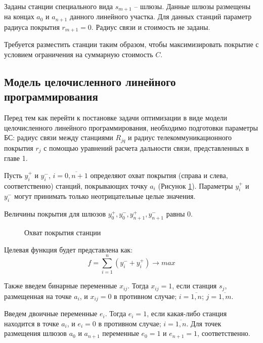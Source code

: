 Заданы станции специального вида $s_{m+1}$ -- шлюзы. Данные шлюзы размещены на концах $a_0$ и $a_{n+1}$ данного линейного участка. Для данных станций параметр радиуса покрытия $r_{m+1}=0$. Радиус связи и стоимость не заданы.

Требуется разместить станции таким образом, чтобы максимизировать покрытие с условием ограничения на суммарную стоимость $C$.


\subsection{Модель целочисленного линейного программирования}

Перед тем как перейти к постановке задачи оптимизации в виде модели целочисленного линейного программирования, необходимо подготовки параметры БС: радиус связи между станциями $R_{jq}$ и радиус телекоммуникационного покрытия $r_j$ с помощью уравнений расчета дальности связи, представленных в главе 1.



Пусть $y_i^+$ и $y_i^-$, $i= \overline{0,n+1}$ определяют охват покрытия (справа и слева, соответственно) станций, покрывающих точку $a_i$ (Рисунок \cref{fig:part3_station_coverage}). Параметры $y_i^+$ и $y_i^-$ могут принимать только неотрицательные целые значения.

Величины  покрытия для шлюзов $y_0^+, y_0^-, y_{n+1}^+, y_{n+1}^-$ равны 0.

\begin{figure}[ht]
  \caption{Охват покрытия станции}\label{fig:part3_station_coverage}
\end{figure}
 
Целевая функция будет представлена как:
\begin{equation}
  \label{eq:part3_objective_function}
  f =  \sum\limits_{i=1}^n (y_i^- + y_i^+) \rightarrow max
\end{equation}

Также введем бинарные переменные $x_{ij}$. Тогда $x_{ij}=1$, если станция $s_j$, размещенная на точке $a_i$, и $x_{ij}=0$ в противном случае; $i= \overline{1, n}$; $j = \overline{1,m}$.

Введем двоичные переменные $ e_i $. Тогда $ e_i = 1 $, если какая-либо станция находится в точке $ a_i $, и $ e_i = 0$  в противном случае; $ i = \overline {1, n} $. Для точек размещения шлюзов $ a_0 $ и $a_{n + 1}$ переменные $ e_0 = 1 $ и $ e_{n + 1} =1 $, соответственно. 

